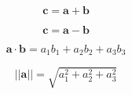 \documentclass{article}
\begin{document}
\[
\mathbf{c} = \mathbf{a} + \mathbf{b}
\]
\pagebreak

\[
\mathbf{c} = \mathbf{a} - \mathbf{b}
\]
\pagebreak

\[
\mathbf{a} \cdot \mathbf{b} = a_1b_1 + a_2b_2 + a_3b_3
\]
\pagebreak

\[
 ||\mathbf{a}|| = \sqrt{a_1^2 + a_2^2 + a_3^2}
 \]
\pagebreak
\end{document}
